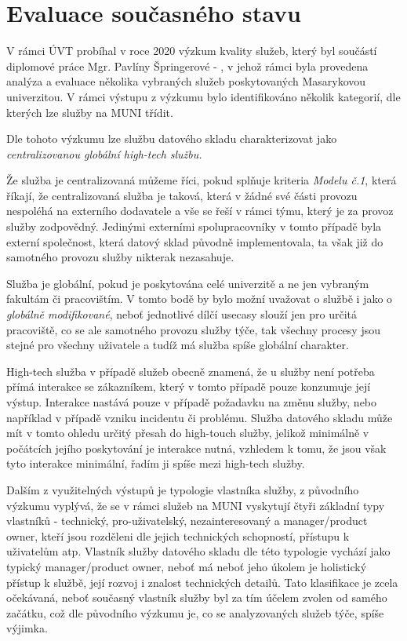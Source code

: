 \documentclass[
  digital,     %
  twoside,     %
  lof,         %
  lot,         %
]{fithesis4}
\begin{document}
\section{Evaluace současného stavu}
V rámci ÚVT probíhal v roce 2020 výzkum kvality služeb, který byl součástí diplomové práce Mgr. Pavlíny Špringerové - , v jehož rámci byla provedena analýza a evaluace několika vybraných služeb poskytovaných Masarykovou univerzitou. V rámci výstupu z výzkumu bylo identifikováno několik kategorií, dle kterých lze služby na MUNI třídit. 

Dle tohoto výzkumu lze službu datového skladu charakterizovat jako \emph{centralizovanou globální high-tech službu.} 

Že služba je centralizovaná můžeme říci, pokud splňuje kriteria \emph{Modelu č.1}, která říkají, že centralizovaná služba je taková, která v žádné své části provozu nespoléhá na externího dodavatele a vše se řeší v rámci týmu, který je za provoz služby zodpovědný.\parencite[s. 103]{Springerova2020} Jedinými externími spolupracovníky v tomto případě byla externí společnost, která datový sklad původně implementovala, ta však již do samotného provozu služby nikterak nezasahuje. 

Služba je globální, pokud je poskytována celé univerzitě a ne jen vybraným fakultám či pracovištím.\parencite[s. 47]{Springerova2020} V tomto bodě by bylo možní uvažovat o službě i jako o \emph{globálně modifikované}, neboť jednotlivé dílčí usecasy slouží jen pro určitá pracoviště, co se ale samotného provozu služby týče, tak všechny procesy jsou stejné pro všechny uživatele a tudíž má služba spíše globální charakter.

High-tech služba v případě služeb obecně znamená, že u služby není potřeba přímá interakce se zákazníkem, který v tomto případě pouze konzumuje její výstup. Interakce nastává pouze v případě požadavku na změnu služby, nebo například v případě vzniku incidentu či problému.\parencite[s. 47]{Springerova2020} Služba datového skladu může mít v tomto ohledu určitý přesah do high-touch služby, jelikož minimálně v počátcích jejího poskytování je interakce nutná, vzhledem k tomu, že jsou však tyto interakce minimální, řadím ji spíše mezi high-tech služby.

Dalším z využitelných výstupů je typologie vlastníka služby, z původního výzkumu vyplývá, že se v rámci služeb na MUNI vyskytují čtyři základní typy vlastníků - technický, pro-uživatelský, nezainteresovaný a manager/product owner, kteří jsou rozděleni dle jejich technických schopností, přístupu k uživatelům atp.\parencite[s. 78]{Springerova2020} Vlastník služby datového skladu dle této typologie vychází jako typický manager/product owner, neboť má neboť jeho úkolem je holistický přístup k službě, její rozvoj i znalost technických detailů.  Tato klasifikace je zcela očekávaná, neboť současný vlastník služby byl za tím účelem zvolen od samého začátku, což dle původního výzkumu je, co se analyzovaných služeb týče, spíše výjimka. 
\end{document}
